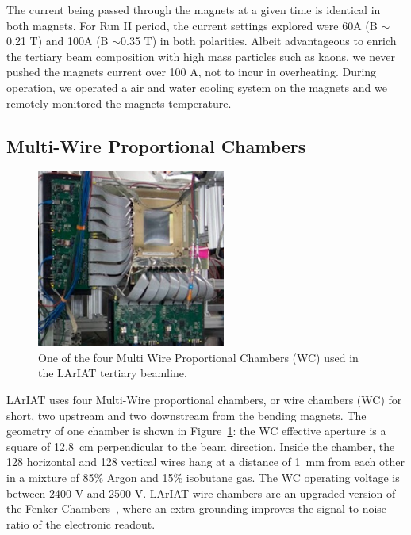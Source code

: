 The current being passed through the magnets at a given time is identical in both magnets. For Run II period, the current settings explored were 60A (B $\sim$0.21 T) and 100A (B $\sim$0.35 T) in both polarities. 
Albeit advantageous to enrich the tertiary beam composition with high mass particles such as kaons, we never pushed the magnets current over 100 A, not to incur in overheating.  During operation, we operated a air and water cooling system on the magnets and we remotely monitored the magnets temperature.
 
\subsection{Multi-Wire Proportional Chambers}\label{sec:MWPC}
\begin{figure}[!h]
\begin{centering}
\vspace{-0.3cm}
\includegraphics[height=2.3in]{Chapter-3/Images/WireChamber.png}
\caption{
{One of the four Multi Wire Proportional Chambers (WC) used in the LArIAT tertiary beamline.}
}
\label{fig:wirechamber}
\end{centering}
\end{figure}

LArIAT uses four Multi-Wire proportional chambers, or wire chambers (WC) for short, two upstream and two downstream from the bending magnets. The geometry of one chamber is shown in Figure~\ref{fig:wirechamber}: the WC effective aperture is a square of  12.8~cm perpendicular to the beam direction.  Inside the chamber, the 128 horizontal and 128 vertical wires hang at a distance of 1~mm from each other in a mixture of 85\% Argon and 15\% isobutane gas.  The WC operating voltage is between 2400 V and 2500 V. LArIAT wire chambers are an upgraded version of the Fenker Chambers~\cite{Fenker}, where an extra grounding improves the signal to noise ratio of the electronic readout.  

